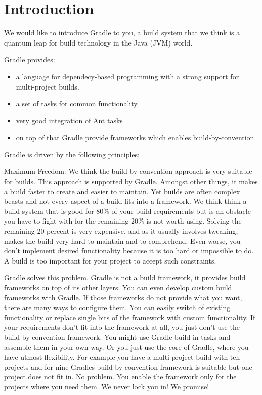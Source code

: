 \chapter{Introduction}

We would like to introduce Gradle to you, a build system that we think is a quantum leap for build technology in the Java (JVM) world.

Gradle provides:
\begin{itemize}
	\item a language for dependecy-based programming with a strong support for multi-project builds.
    \item a set of tasks for common functionality.
    \item very good integration of Ant tasks
    \item on top of that Gradle provide frameworks which enables build-by-convention.
\end{itemize}

Gradle is driven by the following principles:

Maximum Freedom: We think the build-by-convention approach is very suitable for builds. This approach is supported by Gradle. Amongst other things, it makes a build faster to create and easier to maintain. Yet builds are often complex beasts and not every aspect of a build fits into a framework. We think think a build system that is good for 80\% of your build requirements but is an obstacle you have to fight with for the remaining 20\% is not worth using. Solving the remaining 20 percent is very expensive, and as it usually involves tweaking, makes the build very hard to maintain and to comprehend. Even worse, you don't implement desired functionality because it is too hard or impossible to do. A build is too important for your project to accept such constraints.

Gradle solves this problem. Gradle is not a build framework, it provides build frameworks on top of its other layers. You can even develop custom build frameworks with Gradle. If those frameworks do not provide what you want, there are many ways to configure them. You can easily switch of existing functionality or replace single bits of the framework with custom functionality. If your requirements don't fit into the framework at all, you just don't use the build-by-convention framework. You might use Gradle build-in tasks and assemble them in your own way. Or you just use the core of Gradle, where you have utmost flexibility. For example you have a multi-project build with ten projects and for nine Gradles build-by-convention framework is suitable but one project does not fit in. No problem. You enable the framework only for the projects where you need them. We never lock you in! We promise!

